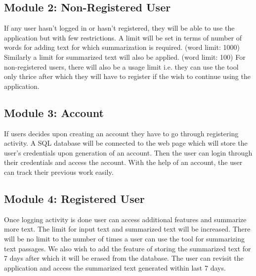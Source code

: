 \subsection{Module 2: Non-Registered User}
If any user hasn’t logged in or hasn’t registered, they will be able to use the application but with few restrictions.
A limit will be set in terms of number of words for adding text for which summarization is required. (word limit: 1000)
Similarly a limit for summarized text will also be applied. (word limit: 100)
For non-registered users, there will also be a usage limit i.e. they can use the tool only thrice after which they will have to register if the wish to continue using the application.

\subsection{Module 3: Account}
If users decides upon creating an account they have to go through registering activity.
A SQL database will be connected to the web page which will store the user’s credentials upon generation of an account.
Then the user can login through their credentials and access the account.
With the help of an account, the user can track their previous work easily.

\subsection{Module 4: Registered User}
Once logging activity is done user can access additional features and summarize more text.
The limit for input text and summarized text will be increased.
There will be no limit to the number of times a user can use the tool for summarizing text passages.
We also wish to add the feature of storing the summarized text for 7 days after which it will be erased from the database. The user can revisit the application and access the summarized text generated within last 7 days.


